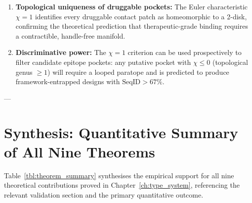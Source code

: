 \begin{enumerate}[leftmargin=1.2cm]
    \item \textbf{Topological uniqueness of druggable pockets:}  The Euler
          characteristic $\chi = 1$ identifies every druggable contact patch
          as homeomorphic to a 2-disk, confirming the theoretical prediction
          that therapeutic-grade binding requires a contractible, handle-free
          manifold.

    \item \textbf{Discriminative power:}  The $\chi = 1$ criterion can be
          used prospectively to filter candidate epitope pockets: any putative
          pocket with $\chi \le 0$ (topological genus $\ge 1$) will require
          a looped paratope and is predicted to produce framework-entrapped
          designs with $\text{SeqID} > 67\%$.
\end{enumerate}

---

\section{Synthesis: Quantitative Summary of All Nine Theorems}
\label{sec:synthesis}

Table~\ref{tbl:theorem_summary} synthesises the empirical support for
all nine theoretical contributions proved in Chapter~\ref{ch:type_system},
referencing the relevant validation section and the primary quantitative outcome.

